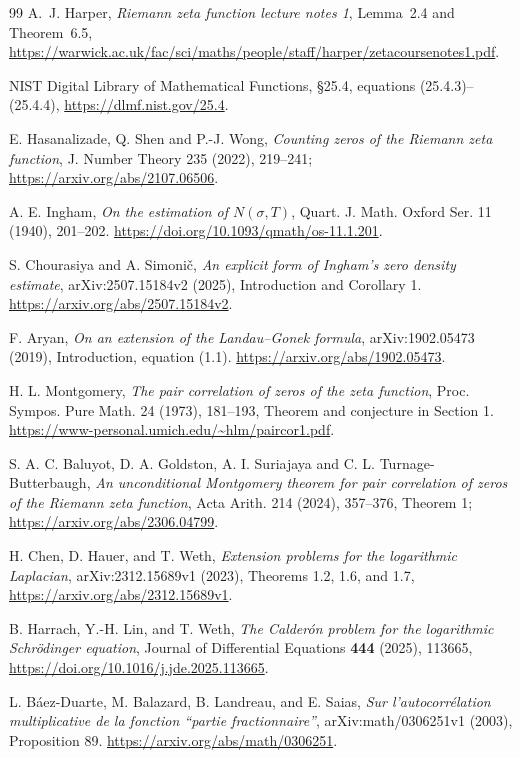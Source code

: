 \documentclass[11pt]{article}
\theoremstyle{remark}
\begin{document}
\begin{thebibliography}{99}
A.~J. Harper, \emph{Riemann zeta function lecture notes 1},
Lemma~2.4 and Theorem~6.5,
\url{https://warwick.ac.uk/fac/sci/maths/people/staff/harper/zetacoursenotes1.pdf}.

NIST Digital Library of Mathematical Functions,
\S25.4, equations (25.4.3)--(25.4.4),
\url{https://dlmf.nist.gov/25.4}.

E. Hasanalizade, Q. Shen and P.-J. Wong,
\emph{Counting zeros of the Riemann zeta function},
J. Number Theory 235 (2022), 219--241;
\url{https://arxiv.org/abs/2107.06506}.

A. E. Ingham, \emph{On the estimation of $N(\sigma,T)$},
Quart. J. Math. Oxford Ser. 11 (1940), 201--202.
\url{https://doi.org/10.1093/qmath/os-11.1.201}.

S. Chourasiya and A. Simoni\v{c},
\emph{An explicit form of Ingham's zero density estimate},
arXiv:2507.15184v2 (2025), Introduction and Corollary 1.
\url{https://arxiv.org/abs/2507.15184v2}.

F. Aryan, \emph{On an extension of the Landau--Gonek formula},
arXiv:1902.05473 (2019), Introduction, equation (1.1).
\url{https://arxiv.org/abs/1902.05473}.

H. L. Montgomery, \emph{The pair correlation of zeros of the zeta
function}, Proc. Sympos. Pure Math. 24 (1973), 181--193,
Theorem and conjecture in Section 1.
\url{https://www-personal.umich.edu/~hlm/paircor1.pdf}.

S. A. C. Baluyot, D. A. Goldston, A. I. Suriajaya and
C. L. Turnage-Butterbaugh,
\emph{An unconditional Montgomery theorem for pair correlation of
zeros of the Riemann zeta function}, Acta Arith. 214 (2024), 357--376,
Theorem 1; \url{https://arxiv.org/abs/2306.04799}.

H. Chen, D. Hauer, and T. Weth,
\emph{Extension problems for the logarithmic Laplacian},
arXiv:2312.15689v1 (2023), Theorems 1.2, 1.6, and 1.7,
\url{https://arxiv.org/abs/2312.15689v1}.

B. Harrach, Y.-H. Lin, and T. Weth,
\emph{The Calder\'on problem for the logarithmic Schr\"odinger equation},
Journal of Differential Equations \textbf{444} (2025), 113665,
\url{https://doi.org/10.1016/j.jde.2025.113665}.


L. B\'aez-Duarte, M. Balazard, B. Landreau, and E. Saias,
\emph{Sur l'autocorr\'elation multiplicative de la fonction
``partie fractionnaire''}, arXiv:math/0306251v1 (2003), Proposition 89.
\url{https://arxiv.org/abs/math/0306251}.


\end{thebibliography}
\end{document}
